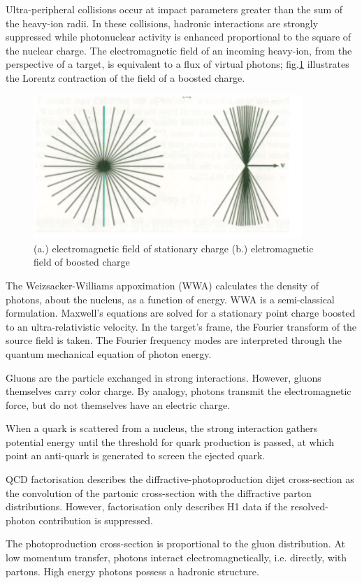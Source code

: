 Ultra-peripheral collisions occur at impact parameters greater than the sum of the heavy-ion radii. In these collisions, hadronic interactions are strongly suppressed while photonuclear activity is enhanced proportional to the square of the nuclear charge. The electromagnetic field of an incoming heavy-ion, from the perspective of a target, is equivalent to a flux of virtual photons; fig.\ref{fig:smushedField} illustrates the Lorentz contraction of the field of a boosted charge.

\begin{figure}[h!]
\begin{centering}
\includegraphics[width=4in]{Chapter1/importfigs/jackson_em_wwa.png}
\par\end{centering}
\caption{ (a.) electromagnetic field of stationary charge (b.) eletromagnetic field of boosted charge \label{fig:smushedField}}
\end{figure}

The Weizsacker-Williams appoximation (WWA) calculates the density of photons, about the nucleus, as a function of energy. WWA is a semi-classical formulation. Maxwell's equations are solved for a stationary point charge boosted to an ultra-relativistic velocity. In the target's frame, the Fourier transform of the source field is taken. The Fourier frequency modes are interpreted through the quantum mechanical equation of photon energy. 

Gluons are the particle exchanged in strong interactions. However, gluons themselves carry color charge. By analogy, photons transmit the electromagnetic force, but do not themselves have an electric charge. 

When a quark is scattered from a nucleus, the strong interaction gathers potential energy until the threshold for quark production is passed, at which point an anti-quark is generated to screen the ejected quark.

QCD factorisation describes the diffractive-photoproduction dijet cross-section as the convolution of the partonic cross-section with the diffractive parton distributions. However, factorisation only describes H1 data if the resolved-photon contribution is suppressed. 

The photoproduction cross-section is proportional to the gluon distribution. At low momentum transfer, photons interact electromagnetically, i.e. directly, with partons. High energy photons possess a hadronic structure. 